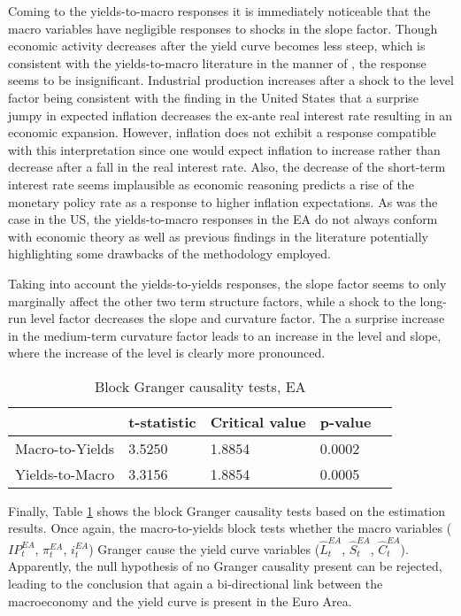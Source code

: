 Coming to the yields-to-macro responses it is immediately noticeable that the macro variables have negligible responses to shocks in the slope factor. Though economic activity decreases after the yield curve becomes less steep, which is consistent with the yields-to-macro literature in the manner of \citet{estrella1991term}, the response seems to be insignificant. 
Industrial production increases after a shock to the level factor being consistent with the finding in the United States that a surprise jumpy in expected inflation decreases the ex-ante real interest rate resulting in an economic expansion. 
However, inflation does not exhibit a response compatible with this interpretation 
since one would expect inflation to increase rather than decrease after a fall in the real interest rate.
Also, the decrease of the short-term interest rate seems implausible as economic reasoning predicts a rise of the monetary policy rate as a response to higher inflation expectations. 
As was the case in the US, the yields-to-macro responses in the EA do not always conform with economic theory as well as previous findings in the literature potentially highlighting some drawbacks of the methodology employed. 

Taking into account the yields-to-yields responses, the slope factor seems to only marginally affect the other two term structure factors, while a shock to the long-run level factor decreases the slope and curvature factor.
The a surprise increase in the medium-term curvature factor leads to an increase in the level and slope, where the increase of the level is clearly more pronounced.



\begin{table}[!t]
    \centering
    \begin{tabular}{lllll}
    \toprule
    {} &     t-statistic &      Critical value &                 p-value 
    \\
    \midrule
    Macro-to-Yields &  3.5250 &  1.8854 &  0.0002 &  \\
    Yields-to-Macro &   3.3156 &  1.8854 &  0.0005  \\
\bottomrule
    \end{tabular}
    \caption{Block Granger causality tests, EA}
    \label{tab:granger_ea}
\end{table}


Finally, Table \ref{tab:granger_ea} shows the block Granger causality tests based on the estimation results. 
Once again, the macro-to-yields block tests whether the macro variables ($IP^{EA}_{t}$, $\pi^{EA}_{t}$, $i^{EA}_{t}$) Granger cause the yield curve variables ($\hat{L}^{EA}_{t}$, $\hat{S}^{EA}_{t}$, $\hat{C}^{EA}_{t}$).
Apparently, the null hypothesis of no Granger causality present can be rejected,
leading to the conclusion that again a bi-directional link between the macroeconomy and the yield curve is present in the Euro Area. 





